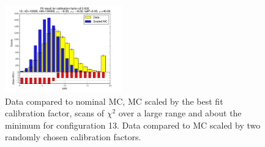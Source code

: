 \begin{figure}[htbp]
\begin{center}
\includegraphics[width=0.45\textwidth]{../FIGURES/13/FIG_Fit_result_for_calibration_factor_of_0_820.pdf} 
\caption{Data compared to nominal MC, MC scaled by the best fit calibration factor, scans of $\chi^2$ over a large range and about the minimum for configuration 13. Data compared to MC scaled by two randomly chosen calibration factors.} 
\label{tab:best_13} 
\end{center} \end{figure} 

